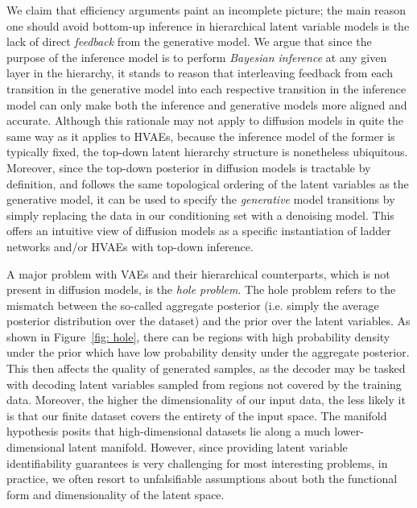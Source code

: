 We claim that efficiency arguments paint an incomplete picture; the main reason one should avoid bottom-up inference in hierarchical latent variable models is the lack of direct \textit{feedback} from the generative model. We argue that since the purpose of the inference model is to perform \textit{Bayesian inference} at any given layer in the hierarchy, it stands to reason that interleaving feedback from each transition in the generative model into each respective transition in the inference model can only make both the inference and generative models more aligned and accurate. Although this rationale may not apply to diffusion models in quite the same way as it applies to HVAEs, because the inference model of the former is typically fixed, the top-down latent hierarchy structure is nonetheless ubiquitous. Moreover, since the top-down posterior in diffusion models is tractable by definition, and follows the same topological ordering of the latent variables as the generative model, it can be used to specify the \textit{generative} model transitions by simply replacing the data in our conditioning set with a denoising model. This offers an intuitive view of diffusion models as a specific instantiation of ladder networks and/or HVAEs with top-down inference.

A major problem with VAEs and their hierarchical counterparts, which is not present in diffusion models, is the \textit{hole problem}. The hole problem refers to the mismatch between the so-called aggregate posterior (i.e. simply the average posterior distribution over the dataset) and the prior over the latent variables. As shown in Figure~\ref{fig: hole}, there can be regions with high probability density under the prior which have low probability density under the aggregate posterior. This then affects the quality of generated samples, as the decoder may be tasked with decoding latent variables sampled from regions not covered by the training data. Moreover, the higher the dimensionality of our input data, the less likely it is that our finite dataset covers the entirety of the input space. The manifold hypothesis posits that high-dimensional datasets lie along a much lower-dimensional latent manifold. However, since providing latent variable identifiability guarantees is very challenging for most interesting problems, in practice, we often resort to unfalsifiable assumptions about both the functional form and dimensionality of the latent space.

